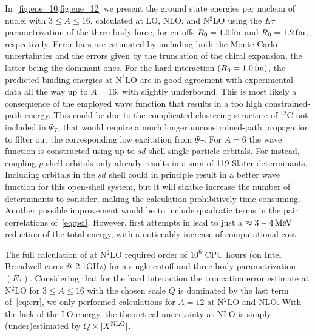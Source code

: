 \documentclass[aps,prc,twocolumn,superscriptaddress,showpacs,floatfix,nofootinbib]{revtex4-1}
\begin{document}
In~\cref{fig:ene_10,fig:ene_12} we present the ground state energies per nucleon
of nuclei with $3\le A\le16$, calculated at LO, NLO, and N$^2$LO using
the $E\tau$ parametrization of the three-body force, for cutoffs $R_0=1.0\,\rm fm$ 
and $R_0=1.2\,\rm fm$, respectively. Error bars are estimated by 
including both the Monte Carlo uncertainties and the errors given by 
the truncation of the chiral expansion, the latter being the dominant ones.
For the hard interaction $(R_0=1.0\,\rm fm)$, the predicted binding energies at N$^2$LO 
are in good agreement with experimental data all the way up to $A=16$, with 
 slightly underbound.
This is most likely a consequence of the employed wave function that results 
in a too high constrained-path energy. 
This could be due to the complicated clustering structure of $^{12}$C not included
in $\Psi_T$, that would require a much longer unconstrained-path propagation
to filter out the corresponding low excitation from $\Psi_T$.
For $A=6$ the wave
function is constructed using up to $sd$ shell single-particle orbitals. For  
instead, coupling $p$ shell orbitals only
already results in a sum of 119 Slater determinants. Including orbitals in the $sd$ shell could 
in principle result in a better wave function for this open-shell system, but it will 
sizable increase the number of determinants to consider, making the calculation prohibitively 
time consuming. Another possible improvement would be to include quadratic terms in
the pair correlations of~\cref{eq:psi}. However, first attempts in
 lead to just a $\approx3-4\,\rm MeV$ reduction of the total 
energy, with a noticeably increase of computational cost. 

The full calculation of  at N$^2$LO required 
order of $10^6$ CPU hours (on Intel Broadwell cores @ 2.1GHz) for a single cutoff and
three-body parametrization $(E\tau)$. 
Considering that for the hard interaction the truncation error estimate at N$^2$LO
for $3\le A\le 16$ with the chosen scale $Q$ is dominated by the last term of~\cref{eq:err}, 
we only performed calculations for $A=12$ at N$^2$LO and NLO. With the lack of the LO energy, 
the theoretical uncertainty at NLO is simply (under)estimated by $Q\times|X^{\rm NLO}|$.
\end{document}
